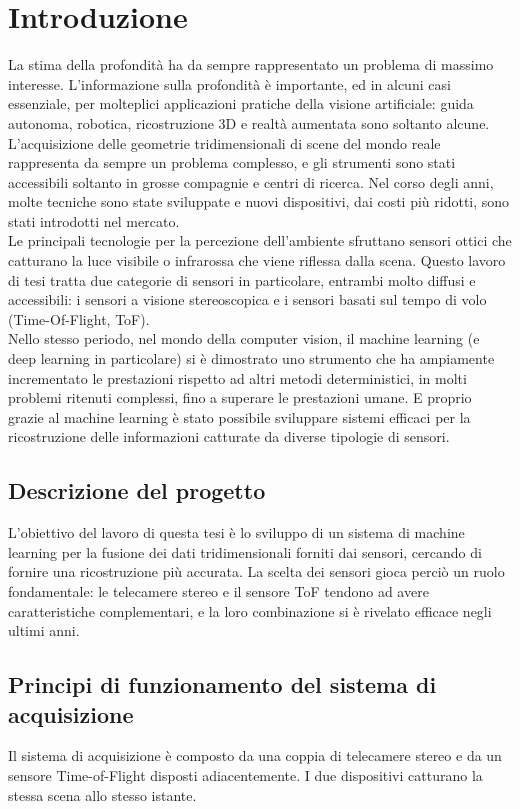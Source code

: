 \chapter{Introduzione}  
La stima della profondità ha da sempre rappresentato un problema di massimo interesse. L'informazione sulla profondità è importante, ed in alcuni casi essenziale, per molteplici applicazioni pratiche della visione artificiale: guida autonoma, robotica, ricostruzione 3D e realtà aumentata sono soltanto alcune. \\
L'acquisizione delle geometrie tridimensionali di scene del mondo reale rappresenta da sempre un problema complesso, e gli strumenti sono stati accessibili soltanto in grosse compagnie e centri di ricerca. Nel corso degli anni, molte tecniche sono state sviluppate e nuovi dispositivi, dai costi più ridotti, sono stati introdotti nel mercato.\\
Le principali tecnologie per la percezione dell'ambiente sfruttano sensori ottici che catturano la luce visibile o infrarossa che viene riflessa dalla scena. Questo lavoro di tesi tratta due categorie di sensori in particolare, entrambi molto diffusi e accessibili: i sensori a visione stereoscopica e i sensori basati sul tempo di volo (Time-Of-Flight, ToF).\\
Nello stesso periodo, nel mondo della computer vision, il machine learning (e deep learning in particolare) si è dimostrato uno strumento che ha ampiamente incrementato le prestazioni rispetto ad altri metodi deterministici, in molti problemi ritenuti complessi, fino a superare le prestazioni umane. E proprio grazie al machine learning è stato possibile sviluppare sistemi efficaci per la ricostruzione delle informazioni catturate da diverse tipologie di sensori.

\section{Descrizione del progetto}
L'obiettivo del lavoro di questa tesi è lo sviluppo di un sistema di machine learning per la fusione dei dati tridimensionali forniti dai sensori, cercando di fornire una ricostruzione più accurata. La scelta dei sensori gioca perciò un ruolo fondamentale: le telecamere stereo e il sensore ToF tendono ad avere caratteristiche complementari, e la loro combinazione si è rivelato efficace negli ultimi anni. 

\section{Principi di funzionamento del sistema di acquisizione}
Il sistema di acquisizione è composto da una coppia di telecamere stereo e da un sensore Time-of-Flight disposti adiacentemente. I due dispositivi catturano la stessa scena allo stesso istante.

